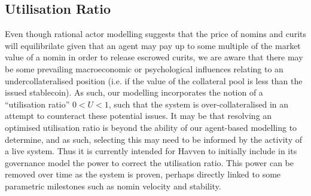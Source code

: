 \subsection{Utilisation Ratio} Even though rational actor modelling suggests that the price of nomins and curits will equilibrilate
given that an agent may pay up to some multiple of the market value of a nomin in order to release escrowed curits, we are aware that there may be some
prevailing macroeconomic or psychological influences relating to an undercollateralised position
(i.e. if the value of the collateral pool is less than the issued stablecoin). As such, our modelling incorporates the notion of a ``utilisation ratio''
\(0 < U < 1\), such that the system is over-collateralised in an attempt to counteract these potential issues. It may be that resolving an
optimised utilisation ratio is beyond the ability of our agent-based modelling to determine, and as such, selecting this may need to be
informed by the activity of a live system. Thus it is currently intended for Havven to initially include in its governance model the power
to correct the utilisation ratio. This power can be removed over time as the system is proven, perhaps directly linked to some parametric milestones such as nomin velocity and stability.


\pagebreak